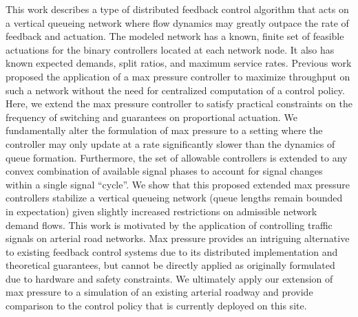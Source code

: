 \begin{footnotesize}
This work describes a type of distributed feedback control algorithm that acts on a vertical queueing network where flow dynamics may greatly outpace the rate of feedback and actuation. The modeled network has a known, finite set of feasible actuations for the binary controllers located at each network node. It also has known expected demands, split ratios, and maximum service rates. Previous work proposed the application of a max pressure controller to maximize throughput on such a network without the need for centralized computation of a control policy. Here, we extend the max pressure controller to satisfy practical constraints on the frequency of switching and guarantees on proportional actuation. We fundamentally alter the formulation of max pressure to a setting where the controller may only update at a rate significantly slower than the dynamics of queue formation. Furthermore, the set of allowable controllers is extended to any convex combination of available signal phases to account for signal changes within a single signal ``cycle''. We show that this proposed extended max pressure controllers stabilize a vertical queueing network (queue lengths remain bounded in expectation) given slightly increased restrictions on admissible network demand flows.  
This work is motivated by the application of controlling traffic signals on arterial road networks. Max pressure provides an intriguing alternative to existing feedback control systems due to its distributed implementation and theoretical guarantees, but cannot be directly applied as originally formulated due to hardware and safety constraints. We ultimately apply our extension of max pressure to a simulation of an existing arterial roadway and provide comparison to the control policy that is currently deployed on this site. 
\end{footnotesize}

